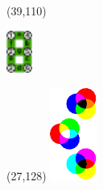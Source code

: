 \documentclass{extarticle}
\begin{document}
\begin{textblock}{0}(39,110)
\vfill
{\centerline{\includegraphics[height=14mm]{tools/images/segment-numbering.pdf}}} 
\vfill
\end{textblock}

\begin{textblock}{0}(27,128)%
\vfill
{\includegraphics[scale=1.1]{tools/mixing.pdf}}
\vfill
\end{textblock}
\end{document}
